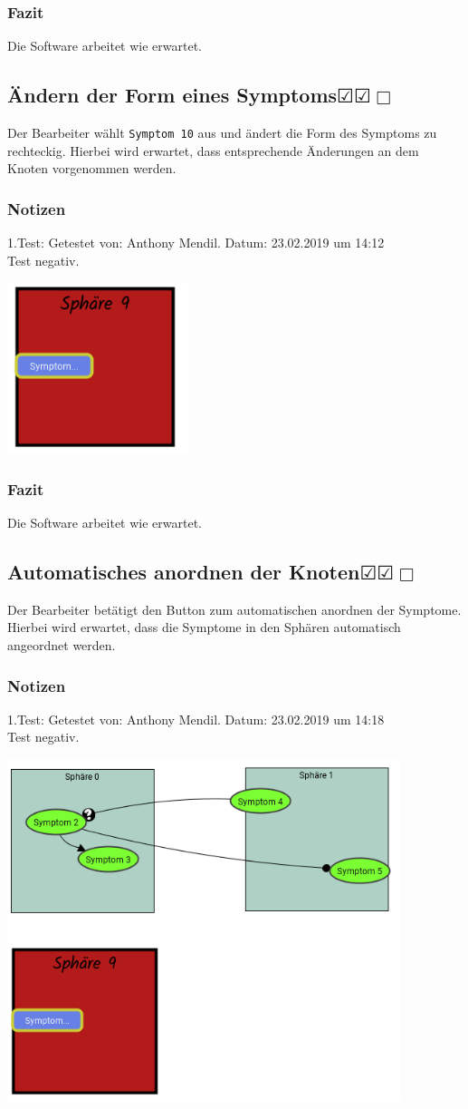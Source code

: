 \documentclass{scrartcl}
\newcommand{\subsectiont}[2]{\subsection[#1]{#1{\normalsize\normalfont #2}}}
\newcommand{\leer}{$\Box$}
\newcommand{\ok}{$\CheckedBox$}
\begin{document}
\subsubsection{Fazit}
Die Software arbeitet wie erwartet.

\subsectiont{Ändern der Form eines Symptoms}{\dotfill\ok\ok\leer}
Der Bearbeiter wählt \texttt{Symptom 10} aus und ändert die Form des Symptoms zu rechteckig. Hierbei wird erwartet, dass entsprechende Änderungen an dem Knoten vorgenommen werden.
\subsubsection{Notizen}
1.Test: Getestet von: Anthony Mendil. Datum: 23.02.2019 um 14:12 \\
Test negativ.
\begin{center}
\includegraphics[height=5cm]{2_27.PNG}
\end{center}
\subsubsection{Fazit}
Die Software arbeitet wie erwartet.

\subsectiont{Automatisches anordnen der Knoten}{\dotfill\ok\ok\leer}
Der Bearbeiter betätigt den Button zum automatischen anordnen der Symptome. Hierbei wird erwartet, dass die Symptome in den Sphären automatisch angeordnet werden. 
\subsubsection{Notizen}
1.Test: Getestet von: Anthony Mendil. Datum: 23.02.2019 um 14:18 \\
Test negativ.
\begin{center}
\includegraphics[height=10cm]{2_28.PNG}
\end{center}
\end{document}
